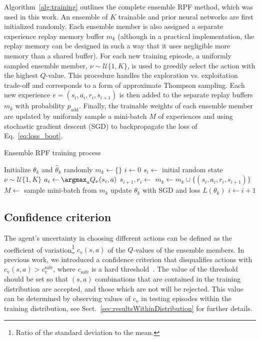 Algorithm~\ref{alg:training} outlines the complete ensemble RPF method, which was used in this work. An ensemble of $K$ trainable and prior neural networks are first initialized randomly. Each ensemble member is also assigned a separate experience replay memory buffer $m_k$ (although in a practical implementation, the replay memory can be designed in such a way that it uses negligible more memory than a shared buffer). For each new training episode, a uniformly sampled ensemble member, $\nu \sim \mathcal{U}\{1,K\}$, is used to greedily select the action with the highest $Q$-value. This procedure handles the exploration vs. exploitation trade-off and corresponds to a form of approximate Thompson sampling. Each new experience $e = (s_i, a_i, r_i, s_{i+1})$ is then added to the separate replay buffers $m_k$ with probability $p_\mathrm{add}$. Finally, the trainable weights of each ensemble member are updated by uniformly sample a mini-batch $M$ of experiences and using stochastic gradient descent (SGD) to backpropagate the loss of Eq.~\ref{eq:loss_boot}.

\begin{algorithm}[!t]
	\caption{Ensemble RPF training process}\label{alg:training}
	\begin{algorithmic}[1]
			\State Initialize $\theta_k$ and $\hat{\theta}_k$ randomly
			\State $m_k \gets \{\}$
		\EndFor
		\State $i \gets 0$
			\State $s_i \gets $ initial random state
			\State $\nu \sim \mathcal{U}\{1,K\}$%
				\State $a_i \gets \argmax_{a} Q_\nu(s_i,a)$
				\State $s_{i+1}, r_i \gets $ 
						\State $m_k \gets m_k \cup \{(s_i, a_i, r_i, s_{i+1})\}$
					\EndIf
					\State $M \gets $ sample mini-batch from $m_k$
					\State update $\theta_k$ with SGD and loss $L(\theta_k)$
				\EndFor
				\State $i \gets i + 1$
			\EndWhile
		\EndWhile
	\end{algorithmic}
\end{algorithm}


\subsection{Confidence criterion}
\label{sec:safetyCriterion}

The agent's uncertainty in choosing different actions can be defined as the coefficient of variation\footnote{Ratio of the standard deviation to the mean.} $c_\mathrm{v}(s,a)$ of the $Q$-values of the ensemble members.  
In previous work, we introduced a confidence criterion that disqualifies actions with $c_\mathrm{v}(s,a) > c_\mathrm{v}^\mathrm{safe}$, where $c_\mathrm{safe}$ is a hard threshold~\cite{Hoel2020}. 
The value of the threshold should be set so that $(s,a)$ combinations that are contained in the training distribution are accepted, and those which are not will be rejected. This value can be determined by observing values of $c_\mathrm{v}$ in testing episodes within the training distribution, see Sect.~\ref{sec:resultsWithinDistribution} for further details. 


